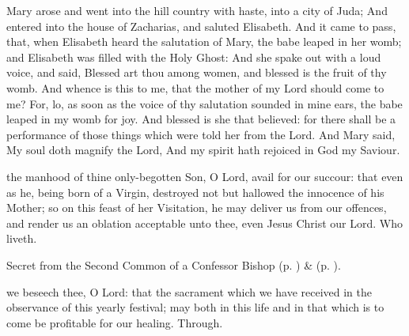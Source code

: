 
 Mary arose and went into the hill country with haste, into a city of Juda; And entered into the house of Zacharias, and saluted Elisabeth. And it came to pass, that, when Elisabeth heard the salutation of Mary, the babe leaped in her womb; and Elisabeth was filled with the Holy Ghost: And she spake out with a loud voice, and said, Blessed art thou among women, and blessed is the fruit of thy womb. And whence is this to me, that the mother of my Lord should come to me? For, lo, as soon as the voice of thy salutation sounded in mine ears, the babe leaped in my womb for joy. And blessed is she that believed: for there shall be a performance of those things which were told her from the Lord. And Mary said, My soul doth magnify the Lord, And my spirit hath rejoiced in God my Saviour.


\secret
{} the manhood of thine only-begotten Son, O Lord, avail for our succour: that even as he, being born of a Virgin, destroyed not but hallowed the innocence of his Mother; so on this feast of her Visitation, he may deliver us from our offences, and render us an oblation acceptable unto thee, even Jesus Christ our Lord. Who liveth.

\begin{rubric}
	  Secret  from the Second Common of a Confessor Bishop (p. \pageref{CommonConfessorBishopIISecret}) \&   (p. \pageref{ProcessusSecret}).
\end{rubric}


\clearpage
\postcommunion
{} we beseech thee, O Lord: that the sacrament which we have received in the observance of this yearly festival; may both in this life and in that which is to come be profitable for our healing. Through.

